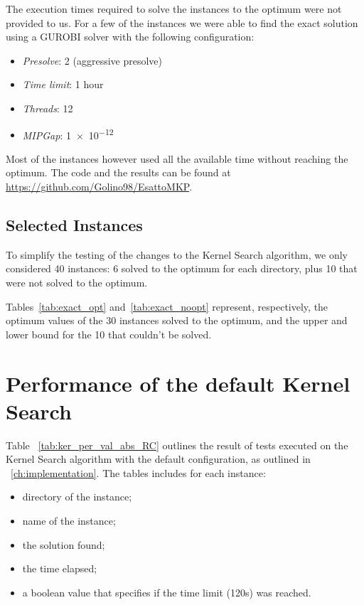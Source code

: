 The execution times required to solve the instances to the optimum were not provided to us.
For a few of the instances we were able to find the exact solution
using a GUROBI solver with the following configuration:

\begin{itemize}
    \item \textit{Presolve}: 2 (aggressive presolve)
    \item \textit{Time limit}: 1 hour
    \item \textit{Threads}: 12
    \item \textit{MIPGap}: \num{1e-12}
\end{itemize}

Most of the instances however used all the available time without reaching the optimum.
The code and the results can be found at \url{https://github.com/Golino98/EsattoMKP}.

\subsection{Selected Instances}\label{subsec:inst}
To simplify the testing of the changes to the Kernel Search algorithm,
we only considered 40 instances: 6 solved to the optimum for each directory,
plus 10 that were not solved to the optimum.

Tables~\ref{tab:exact_opt} and~\ref{tab:exact_noopt} represent,
respectively, the optimum values of the 30 instances solved to
the optimum, and the upper and lower bound for the 10
that couldn't be solved.





\section{Performance of the default Kernel Search}
Table ~\ref{tab:ker_per_val_abs_RC} outlines the result of tests executed on
the Kernel Search algorithm with the default configuration,
as outlined in ~\ref{ch:implementation}.
The tables includes for each instance:
\begin{itemize}
    \item directory of the instance;
    \item name of the instance;
    \item the solution found;
    \item the time elapsed;
    \item a boolean value that specifies if the time limit (120s) was reached.
\end{itemize}
